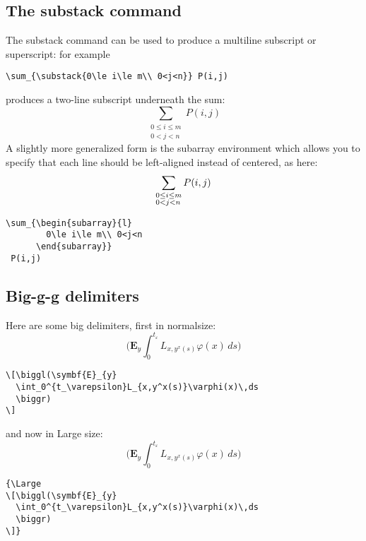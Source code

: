 \documentclass{article}
\newcommand{\ntt}{\normalfont\ttfamily}
\newcommand{\cn}[1]{{\protect\ntt\bslash#1}}
\newcommand{\env}[1]{{\protect\ntt#1}}
\theoremstyle{definition}
\theoremstyle{remark}
\begin{document}
\subsection{The \cn{substack} command}

The \cn{substack} command can be used to produce a multiline
subscript or superscript:
for example
\begin{verbatim}
\sum_{\substack{0\le i\le m\\ 0<j<n}} P(i,j)
\end{verbatim}
produces a two-line subscript underneath the sum:
\begin{equation}
\sum_{\substack{0\le i\le m\\ 0<j<n}} P(i,j)
\end{equation}
A slightly more generalized form is the \env{subarray} environment which
allows you to specify that each line should be left-aligned instead of
centered, as here:
\begin{equation}
\sum_{\begin{subarray}{l}
        0\le i\le m\\ 0<j<n
      \end{subarray}}
 P(i,j)
\end{equation}
\begin{verbatim}
\sum_{\begin{subarray}{l}
        0\le i\le m\\ 0<j<n
      \end{subarray}}
 P(i,j)
\end{verbatim}


\subsection{Big-g-g delimiters}
Here are some big delimiters, first in \cn{normalsize}:
\[\biggl(\symbf{E}_{y}
  \int_0^{t_\varepsilon}L_{x,y^x(s)}\varphi(x)\,ds
  \biggr)
\]
\begin{verbatim}
\[\biggl(\symbf{E}_{y}
  \int_0^{t_\varepsilon}L_{x,y^x(s)}\varphi(x)\,ds
  \biggr)
\]
\end{verbatim}
and now in \cn{Large} size:
{\Large
\[\biggl(\symbf{E}_{y}
  \int_0^{t_\varepsilon}L_{x,y^x(s)}\varphi(x)\,ds
  \biggr)
\]}
\begin{verbatim}
{\Large
\[\biggl(\symbf{E}_{y}
  \int_0^{t_\varepsilon}L_{x,y^x(s)}\varphi(x)\,ds
  \biggr)
\]}
\end{verbatim}

\newpage
\makeatletter
\end{document}
